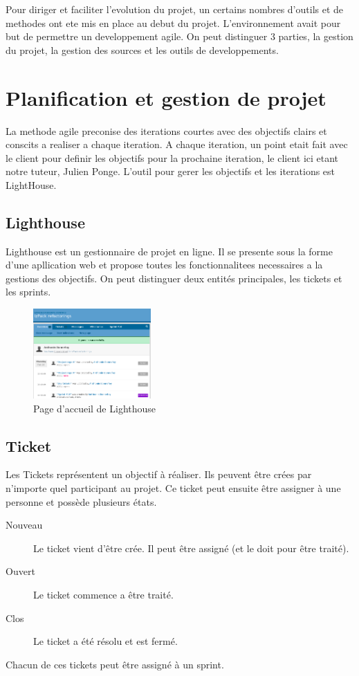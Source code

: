 Pour diriger et faciliter l'evolution du projet, un certains nombres d'outils et de methodes ont ete mis en place au debut du projet. L'environnement avait pour but de permettre un developpement agile. On peut distinguer 3 parties, la gestion du projet, la gestion des sources et les outils de developpements.
\section{Planification et gestion de projet}
La methode agile preconise des iterations courtes avec des objectifs clairs et conscits a realiser a chaque iteration. A chaque iteration, un point etait fait avec le client pour definir les objectifs pour la prochaine iteration, le client ici etant notre tuteur, Julien Ponge. L'outil pour gerer les objectifs et les iterations est LightHouse.
\subsection{Lighthouse}
Lighthouse est un gestionnaire de projet en ligne. Il se presente sous la forme d'une apllication web et propose toutes les fonctionnalitees necessaires a la gestions des objectifs. On peut distinguer deux entités principales, les tickets et les sprints.
\begin{figure}[H]
	\centering
	\includegraphics[width=0.4\textwidth]{../image/lighthouse.png}
	\caption{Page d'accueil de Lighthouse}
\end{figure}
\subsection{Ticket}
Les Tickets représentent un objectif à réaliser. Ils peuvent être crées par n'importe quel participant au projet. Ce ticket peut ensuite être assigner à une personne et possède plusieurs états.
\begin{description}
\item[Nouveau] Le ticket vient d'être crée. Il peut être assigné (et le doit pour être traité).
\item[Ouvert] Le ticket commence a être traité.
\item[Clos] Le ticket a été résolu et est fermé.
\end{description}
Chacun de ces tickets peut être assigné à un sprint.
